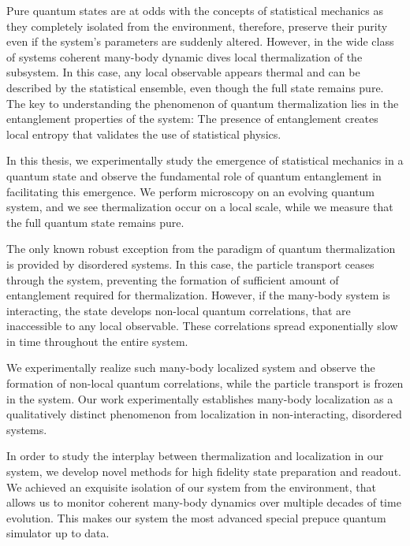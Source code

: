 
Pure quantum states are at odds with the concepts of statistical mechanics as they completely isolated from the environment, therefore, preserve their purity even if the system's parameters are suddenly altered. However, in the wide class of systems coherent many-body dynamic dives local thermalization of the subsystem. In this case, any local observable appears thermal and can be described by the statistical ensemble, even though the full state remains pure. The key to understanding the phenomenon of quantum thermalization lies in the entanglement properties of the system: The presence of entanglement creates local entropy that validates the use of statistical physics.

In this thesis, we experimentally study the emergence of statistical mechanics in a quantum state and observe the fundamental role of quantum entanglement in facilitating this emergence. We perform microscopy on an evolving quantum system, and we see thermalization occur on a local scale, while we measure that the full quantum state remains pure.

The only known robust exception from the paradigm of quantum thermalization is provided by disordered systems. In this case, the particle transport ceases through the system, preventing the formation of sufficient amount of entanglement required for thermalization. However, if the many-body system is interacting, the state develops non-local quantum correlations, that are inaccessible to any local observable. These correlations spread exponentially slow in time throughout the entire system.

We experimentally realize such many-body localized system and observe the formation of non-local quantum correlations, while the particle transport is frozen in the system. Our work experimentally establishes many-body localization as a qualitatively distinct phenomenon from localization in non-interacting, disordered systems.

In order to study the interplay between thermalization and localization in our system, we develop novel methods for high fidelity state preparation and readout. We achieved an exquisite isolation of our system from the environment, that allows us to monitor coherent many-body dynamics over multiple decades of time evolution. This makes our system the most advanced special prepuce quantum simulator up to data.